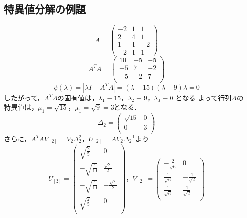 \documentclass[12pt]{jsarticle}
\begin{document}
\subsection{特異値分解の例題}
\begin{equation}
  A=\left( \begin{array}{rrcr}
  -2     & 1        & 1    \\
  2      & 4        & 1    \\
  1      & 1        & -2   \\
  -2     & 1        & 1 
  \end{array} \right)
\end{equation}
\begin{equation}
  \label{}
  A^T A=\left( \begin{array}{rrcr}
  10      & -5       & -5    \\
  -5      & 7        & -2    \\
  -5      & -2       & 7     \\
  \end{array} \right)
\end{equation}
\begin{equation}
  \label{}
  \phi(\lambda) = |\lambda I - A^T A| = (\lambda - 15)(\lambda - 9)\lambda = 0
\end{equation}
したがって，$A^T A$の固有値は，$\lambda_1=15$，$\lambda_2=9$，$\lambda_3=0$ となる
よって行列$A$の特異値は，$\mu_1=\sqrt{15}$，$\mu_1=\sqrt{9}=3$となる．
\begin{equation}
  \label{}
  \Delta_2 = \left( \begin{array}{rrcr}
  \sqrt{15}      & 0    \\
  0              & 3    \\
  \end{array} \right)
\end{equation}
さらに，$A^T A V_{[2]}=V_{2}\Delta_2^2$，$U_{[2]}=A V_2 \Delta_2^{-1}$より
\begin{equation}
  \label{}
  U_{[2]} = \left( \begin{array}{rrcr}
  \sqrt{\frac{2}{5}} & 0  \\
  -\sqrt{\frac{1}{10}} & \frac{\sqrt{2}}{2} \\
  -\sqrt{\frac{1}{10}}  & -\frac{\sqrt{2}}{2} \\
  \sqrt{\frac{2}{5}}   & 0  \\
  \end{array} \right)，
  V_{[2]} = \left( \begin{array}{rrcr}
  -\frac{2}{\sqrt{6}} & 0 \\
  \frac{1}{\sqrt{6}}  & -\frac{1}{\sqrt{2}} \\
  \frac{1}{\sqrt{6}}  & \frac{1}{\sqrt{2}} \\
  \end{array} \right)
\end{equation}
\end{document}
